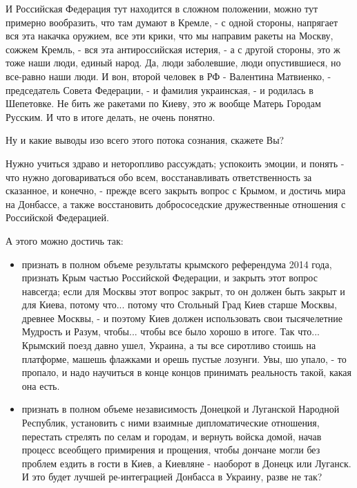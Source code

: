 И Российская Федерация тут находится в сложном положении, можно тут примерно
вообразить, что там думают в Кремле, - с одной стороны, напрягает вся эта
накачка оружием, все эти крики, что мы направим ракеты на Москву, сожжем
Кремль, - вся эта антироссийская истерия, - а с другой стороны, это ж тоже наши
люди, единый народ. Да, люди заболевшие, люди опустившиеся, но все-равно наши
люди.  И вон, второй человек в РФ - Валентина Матвиенко, - председатель Совета
Федерации, - и фамилия украинская, - и родилась в Шепетовке. Не бить же
ракетами по Киеву, это ж вообще Матерь Городам Русским. И что в итоге делать,
не очень понятно.

Ну и какие выводы изо всего этого потока сознания, скажете Вы? 

Нужно учиться здраво и неторопливо рассуждать; успокоить эмоции, и понять - что
нужно договариваться обо всем, восстанавливать ответственность за сказанное, и
конечно, - прежде всего закрыть вопрос с Крымом, и достичь мира на Донбассе, а
также восстановить добрососедские дружественные отношения с Российской
Федерацией.

А этого можно достичь так:

\begin{itemize} %
\item признать в полном объеме результаты крымского референдума 2014 года,
признать Крым частью Российской Федерации, и закрыть этот вопрос навсегда; если
для Москвы этот вопрос закрыт, то он должен быть закрыт и для Киева, потому
что...  потому что Стольный Град Киев старше Москвы, древнее Москвы, - и
поэтому Киев должен использовать свои тысячелетние Мудрость и Разум, чтобы...
чтобы все было хорошо в итоге. Так что... Крымский поезд давно ушел, Украина, а ты все сиротливо
стоишь на платформе, машешь флажками и орешь пустые лозунги. Увы, шо упало, - то пропало,
и надо научиться в конце концов принимать реальность такой, какая она есть.

\item признать в полном объеме независимость Донецкой и Луганской Народной
Республик, установить с ними взаимные дипломатические отношения, перестать
стрелять по селам и городам, и вернуть войска домой, начав процесс всеобщего
примирения и прощения, чтобы дончане могли без проблем ездить в гости в Киев, а
Киевляне - наоборот в Донецк или Луганск. И это будет лучшей ре-интеграцией
Донбасса в Украину, разве не так?

\end{itemize} %

